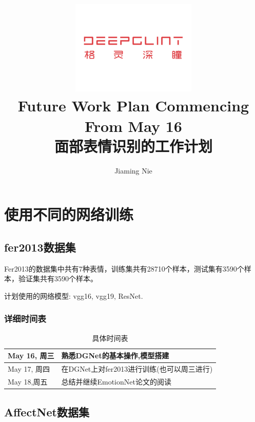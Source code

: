 \documentclass[11pt, a4paper]{article}
\title{\includegraphics[width=0.45\textwidth]{dg}
        \\Future Work Plan Commencing From May 16 \\ 面部表情识别的工作计划 }          %
\author{Jiaming Nie}                    %
\begin{document}
\begin{titlepage}
	
\maketitle
{} %




\thispagestyle{empty}  %

\end{titlepage}


\newpage

\section{使用不同的网络训练}

\subsection{fer2013数据集}
Fer2013的数据集中共有7种表情，训练集共有28710个样本，测试集有3590个样本，验证集共有3590个样本。

计划使用的网络模型: vgg16, vgg19, ResNet. 
\subsubsection{详细时间表}

\begin{table}[htbp] 
	\begin{center}
		\caption{具体时间表}
		\begin{tabular}{|l|p{320pt}|} \hline
		May 16, 周三 & 熟悉DGNet的基本操作,模型搭建 \\ \hline
		May 17, 周四 & 在DGNet上对fer2013进行训练(也可以周三进行) \\ \hline
		May 18,周五 & 总结并继续EmotionNet论文的阅读 \\ \hline
		\end{tabular}
		\label{tab:timetable}
	\end{center}
\end{table}	

\subsection{AffectNet数据集}
\end{document}

